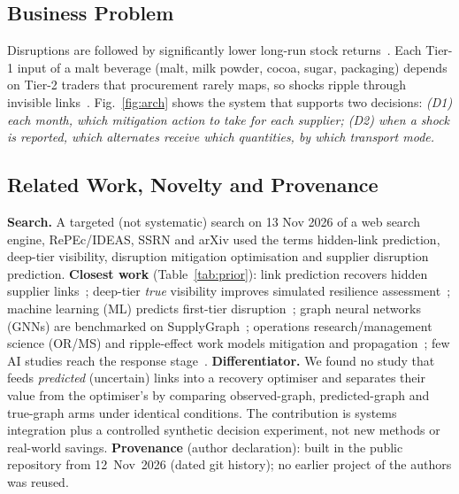 \documentclass[conference]{IEEEtran}
\begin{document}
\subsection{Business Problem}
Disruptions are followed by significantly lower long-run stock returns~\cite{hendricks2005}. Each Tier-1 input of a malt beverage (malt,
milk powder, cocoa, sugar, packaging) depends on Tier-2 traders that procurement rarely maps, so shocks ripple through invisible links~\cite{ivanov2019}. Fig.~\ref{fig:arch} shows the system that supports two decisions: \emph{(D1) each month, which mitigation action to take for each supplier;
(D2) when a shock is reported, which alternates receive which quantities, by which transport mode.}

\subsection{Related Work, Novelty and Provenance}
\textbf{Search.} A targeted (not systematic) search on 13 Nov 2026 of a web search engine, RePEc/IDEAS, SSRN and arXiv used the terms
hidden-link prediction, deep-tier visibility, disruption mitigation optimisation and supplier disruption prediction. \textbf{Closest work} (Table~\ref{tab:prior}): link prediction recovers hidden
supplier links~\cite{brintrup2018,kosasih2022}; deep-tier \emph{true} visibility improves simulated resilience assessment~\cite{taghizadeh2021};
machine learning (ML) predicts first-tier disruption~\cite{brintrup2020}; graph neural networks (GNNs) are benchmarked on SupplyGraph~\cite{wasi2024}; operations research/management science (OR/MS) and ripple-effect work
models mitigation and propagation~\cite{snyder2016,ivanov2019}; few AI studies reach the response stage~\cite{baryannis2019}. \textbf{Differentiator.} We found no study that feeds \emph{predicted} (uncertain) links into a recovery optimiser
and separates their value from the optimiser's by comparing observed-graph, predicted-graph and true-graph arms under identical conditions.
The contribution is systems integration plus a controlled synthetic decision experiment, not new methods or real-world savings.
\textbf{Provenance} (author declaration): built in the public repository from 12~Nov~2026 (dated git history); no earlier project of the authors was reused.
\end{document}
